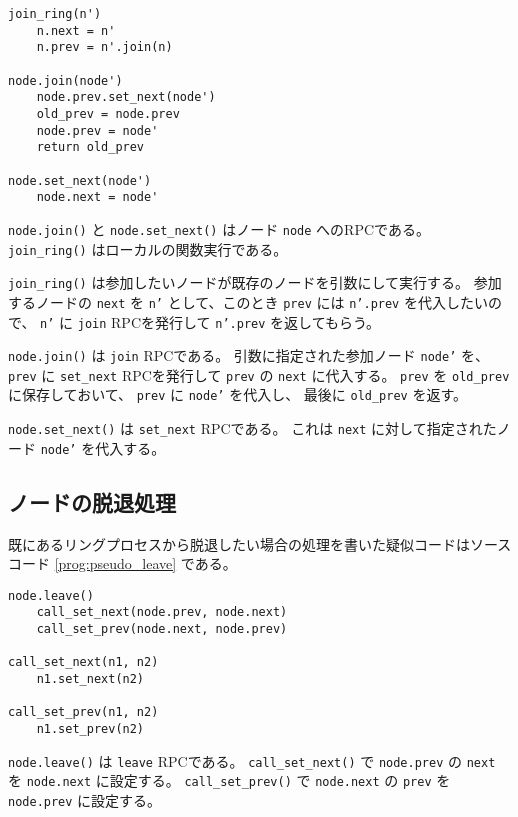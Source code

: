 \documentclass[a4paper]{jlreq}
\begin{document}
\begin{lstlisting}[label=prog:pseudo_join, caption=ノード参加処理の疑似コード]
join_ring(n')
    n.next = n'
    n.prev = n'.join(n)

node.join(node')
    node.prev.set_next(node')
    old_prev = node.prev
    node.prev = node'
    return old_prev

node.set_next(node')
    node.next = node'
\end{lstlisting}

\texttt{node.join()} と \texttt{node.set\_next()} はノード \texttt{node} へのRPCである。
\texttt{join\_ring()} はローカルの関数実行である。

\texttt{join\_ring()} は参加したいノードが既存のノードを引数にして実行する。
参加するノードの \texttt{next} を \texttt{n'} として、このとき \texttt{prev} には \texttt{n'.prev} を代入したいので、
\texttt{n'} に \texttt{join} RPCを発行して \texttt{n'.prev} を返してもらう。

\texttt{node.join()} は \texttt{join} RPCである。
引数に指定された参加ノード \texttt{node'} を、 \texttt{prev} に \texttt{set\_next} RPCを発行して \texttt{prev} の
\texttt{next} に代入する。
\texttt{prev} を \texttt{old\_prev} に保存しておいて、 \texttt{prev} に \texttt{node'} を代入し、
最後に \texttt{old\_prev} を返す。

\texttt{node.set\_next()} は \texttt{set\_next} RPCである。
これは \texttt{next} に対して指定されたノード \texttt{node'} を代入する。

\subsection{ノードの脱退処理}

既にあるリングプロセスから脱退したい場合の処理を書いた疑似コードはソースコード \ref{prog:pseudo_leave} である。

\begin{lstlisting}[label=prog:pseudo_leave, caption=ノード脱退処理の疑似コード]
node.leave()
    call_set_next(node.prev, node.next)
    call_set_prev(node.next, node.prev)

call_set_next(n1, n2)
    n1.set_next(n2)

call_set_prev(n1, n2)
    n1.set_prev(n2)
\end{lstlisting}

\texttt{node.leave()} は \texttt{leave} RPCである。
\texttt{call\_set\_next()} で \texttt{node.prev} の \texttt{next} を \texttt{node.next} に設定する。
\texttt{call\_set\_prev()} で \texttt{node.next} の \texttt{prev} を \texttt{node.prev} に設定する。
\end{document}
